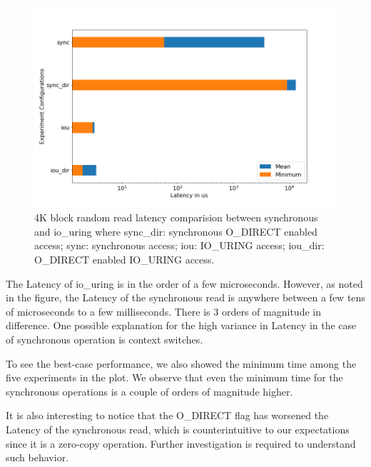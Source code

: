 \documentclass{article}
\begin{document}
\begin{figure}
    \centering
    \includegraphics[scale = 0.4]{latency.png}
    \caption{4K block random read latency comparision between synchronous
    and io\_uring where
    sync\_dir: synchronous O\_DIRECT enabled access;
    sync: synchronous access;
    iou: IO\_URING access;
    iou\_dir: O\_DIRECT enabled IO\_URING access.
    }
    \label{Figure1}
\end{figure}

The Latency of io\_uring is in the order of a few microseconds. However, as noted in the figure, the Latency of the synchronous 
read is anywhere between a few tens of microseconds to a few milliseconds. There is 3 orders of magnitude in difference. 
One possible explanation for the high variance in Latency in the case of synchronous operation is context switches. 

To see the best-case performance, we also showed the minimum time among the five experiments in the plot. We observe that even 
the minimum time for the synchronous operations is a couple of orders of magnitude higher.

It is also interesting to notice that the O\_DIRECT flag has worsened the Latency of the synchronous read, which is 
counterintuitive to our expectations since it is a zero-copy operation. Further investigation is required to understand such 
behavior. 
\end{document}
